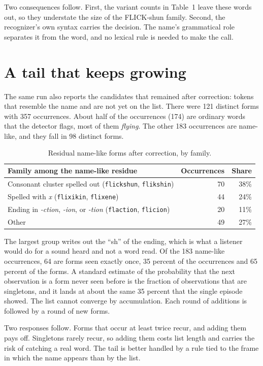 \documentclass[11pt]{article}
\begin{document}
Two consequences follow. First, the variant counts in Table~1 leave these words out, so they understate the size of the FLICK-shun family. Second, the recognizer's own syntax carries the decision. The name's grammatical role separates it from the word, and no lexical rule is needed to make the call.

\section{A tail that keeps growing}

The same run also reports the candidates that remained after correction: tokens that resemble the name and are not yet on the list. There were 121 distinct forms with 357 occurrences. About half of the occurrences (174) are ordinary words that the detector flags, most of them \emph{flying}. The other 183 occurrences are name-like, and they fall in 98 distinct forms.

\begin{table}[h]
\centering
\begin{tabular}{lrr}
\toprule
Family among the name-like residue & Occurrences & Share \\
\midrule
Consonant cluster spelled out (\texttt{flickshun}, \texttt{flikshin}) & 70 & 38\% \\
Spelled with \emph{x} (\texttt{flixikin}, \texttt{flixene}) & 44 & 24\% \\
Ending in \emph{-ction}, \emph{-ion}, or \emph{-tion} (\texttt{flaction}, \texttt{flicion}) & 20 & 11\% \\
Other & 49 & 27\% \\
\bottomrule
\end{tabular}
\caption{Residual name-like forms after correction, by family.}
\end{table}

The largest group writes out the ``sh'' of the ending, which is what a listener would do for a sound heard and not a word read. Of the 183 name-like occurrences, 64 are forms seen exactly once, 35 percent of the occurrences and 65 percent of the forms. A standard estimate of the probability that the next observation is a form never seen before is the fraction of observations that are singletons, and it lands at about the same 35 percent that the single episode showed. The list cannot converge by accumulation. Each round of additions is followed by a round of new forms.

Two responses follow. Forms that occur at least twice recur, and adding them pays off. Singletons rarely recur, so adding them costs list length and carries the risk of catching a real word. The tail is better handled by a rule tied to the frame in which the name appears than by the list.
\end{document}
